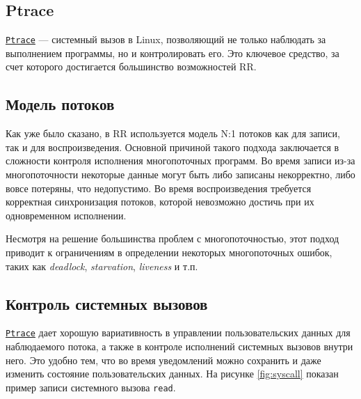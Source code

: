 
\subsection{Ptrace}

\href{https://man7.org/linux/man-pages/man2/ptrace.2.html}{\texttt{Ptrace}} — системный вызов в Linux, позволяющий не только наблюдать за выполнением программы, 
но и контролировать его. Это ключевое средство, за счет которого 
достигается большинство возможностей RR.

\subsection{Модель потоков}

Как уже было сказано, в RR используется модель N:1 потоков как для записи, 
так и для воспроизведения. Основной причиной такого подхода заключается в сложности 
контроля исполнения многопоточных программ. Во время записи из-за многопоточности некоторые данные могут быть либо записаны некорректно, 
либо вовсе потеряны, что недопустимо. Во время воспроизведения требуется корректная синхронизация потоков, 
которой невозможно достичь при их одновременном исполнении.

Несмотря на решение большинства проблем с многопоточностью, этот подход приводит к ограничениям в определении 
некоторых многопоточных ошибок, таких как \textit{deadlock}, \textit{starvation}, \textit{liveness} и т.п.

\subsection{Контроль системных вызовов}

\href{https://man7.org/linux/man-pages/man2/ptrace.2.html}{\texttt{Ptrace}} дает хорошую вариативность в 
управлении пользовательских данных для наблюдаемого потока, 
а также в контроле исполнений системных вызовов внутри него. 
Это удобно тем, что во время уведомлений можно сохранить и даже изменить состояние пользовательских данных. 
На рисунке \ref{fig:syscall} показан пример записи системного вызова \texttt{read}.

